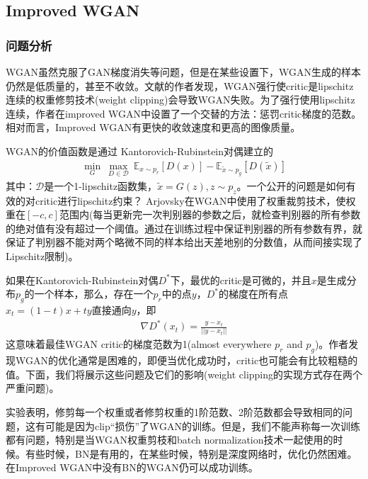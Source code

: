     \subsection{Improved WGAN}
        \subsubsection{问题分析}
            \par
            WGAN虽然克服了GAN梯度消失等问题，但是在某些设置下，WGAN生成的样本仍然是低质量的，甚至不收敛。文献\cite{2017.Ishaan}的作者发现，WGAN强行使critic是lipschitz连续的权重修剪技术(weight clipping)会导致WGAN失败。为了强行使用lipschitz连续，作者在improved WGAN中设置了一个交替的方法：惩罚critic梯度的范数。相对而言，Improved WGAN有更快的收敛速度和更高的图像质量。
            \par
            WGAN的价值函数是通过 Kantorovich-Rubinstein对偶建立的
            \begin{align*}
            \min_G\ \max_{D\in \mathcal{D}} \ \mathbb{E}_{x\sim p_r}[D(x)] - \mathbb{E}_{\tilde{x}\sim p_g}[D(\tilde{x})]
            \end{align*}
            其中：$\mathcal{D}$是一个1-lipschitz函数集，$\tilde{x} = G(z),z\sim p_z$。一个公开的问题是如何有效的对critic进行lipschitz约束？ Arjovsky在WGAN中使用了权重裁剪技术，使权重在$[-c,c]$范围内(每当更新完一次判别器的参数之后，就检查判别器的所有参数的绝对值有没有超过一个阈值。通过在训练过程中保证判别器的所有参数有界，就保证了判别器不能对两个略微不同的样本给出天差地别的分数值，从而间接实现了Lipschitz限制)。
            \par
            如果在Kantorovich-Rubinstein对偶$D^*$下，最优的critic是可微的，并且$x$是生成分布$p_g$的一个样本，那么，存在一个$p_r$中的点$y$，$D^*$的梯度在所有点$x_t = (1-t)x+ty$直接通向$y$，即
            \begin{align*}
            \nabla D^*(x_t) = \frac{y-x_t}{||y-x_t||}
            \end{align*}
            这意味着最佳WGAN critic的梯度范数为1(almost everywhere $p_r$ and $p_g$)。作者发现WGAN的优化通常是困难的，即便当优化成功时，critic也可能会有比较粗糙的值。下面，我们将展示这些问题及它们的影响(weight clipping的实现方式存在两个严重问题)。
            \par
            实验表明，修剪每一个权重或者修剪权重的1阶范数、2阶范数都会导致相同的问题，这有可能是因为clip“损伤”了WGAN的训练。但是，我们不能声称每一次训练都有问题，特别是当WGAN权重剪枝和batch normalization技术一起使用的时候。有些时候，BN是有用的，在某些时候，特别是深度网络时，优化仍然困难。在Improved WGAN中没有BN的WGAN仍可以成功训练。
